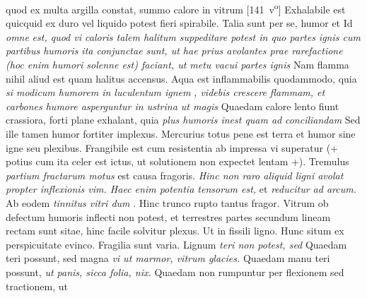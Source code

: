 quod ex multa argilla constat, summo calore in vitrum 
[141~v\textsuperscript{o}]
\pend%
\pstart%
%
%
%
% 
 Exhalabile est quicquid ex duro vel liquido potest fieri spirabile. Talia sunt per se, humor et 
\pend 
\pstart {} Id \textit{omne}
\textit{}
\textit{est, quod vi caloris talem halitum suppeditare potest in quo partes ignis cum partibus humoris ita conjunctae sunt, ut hae prius avolantes prae rarefactione\protect{} (hoc enim humori solenne est) faciant, ut metu vacui\protect{} partes ignis } Nam flamma nihil aliud est quam halitus accensus. Aqua est inflammabilis quodammodo, quia \textit{si modicum humorem in luculentum ignem}
\textit{, videbis crescere flammam, et carbones\protect{} humore asperguntur in ustrina\protect{} ut magis } Quaedam calore lento fiunt crassiora, forti plane exhalant, quia \textit{plus humoris inest quam ad}
\textit{conciliandam } Sed ille tamen humor fortiter implexus. Mercurius\protect{} totus pene est terra et humor sine igne seu plexibus.
\pend 
\pstart {} Frangibile est cum resistentia ab impressa vi superatur (+ potius cum ita celer est ictus, ut solutionem non expectet lentam +). Tremulus\protect{} \textit{partium fractarum motus} est causa fragoris. 
\textit{Hinc non raro aliquid ligni avolat propter inflexionis vim. Haec enim potentia tensorum est,} et \textit{reducitur ad arcum.} Ab eodem
\textit{tinnitus vitri dum }. Hinc trunco rupto tantus fragor. Vitrum ob defectum humoris inflecti non potest, et terrestres partes secundum lineam rectam sunt sitae, hinc facile solvitur plexus. Ut in fissili ligno. Hunc situm ex perspicuitate evinco. Fragilia sunt varia. Lignum \textit{teri non potest, sed
} Quaedam teri possunt, sed magna \textit{vi ut marmor, vitrum glacies.} Quaedam manu teri possunt, \textit{ut panis, sicca folia\protect{}, nix.} Quaedam non rumpuntur per flexionem\protect{} sed tractionem\protect{}, ut 
